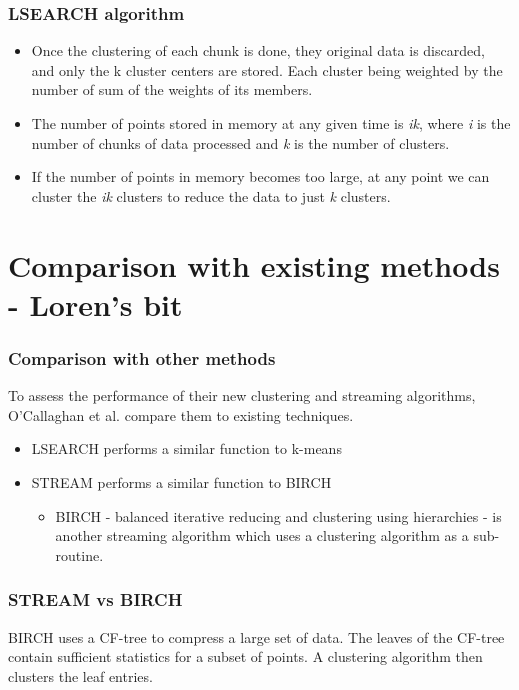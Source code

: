 \documentclass{beamer}
\begin{document}
\frame
{
  \frametitle{LSEARCH algorithm}

   \begin{itemize}
  \item Once the clustering of each chunk is done, they original data
    is discarded, and only the k cluster centers are stored. Each
    cluster being weighted by the number of sum of the weights of its
    members.

  \item The number of points stored in memory at any given time is
    {\em ik}, where {\em i} is the number of chunks of data processed
    and {\em k} is the number of clusters.

  \item If the number of points in memory becomes too large, at any
    point we can cluster the {\em ik} clusters to reduce the data to
    just {\em k} clusters.
  \end{itemize}

}

\section{Comparison with existing methods - Loren's bit}
\frame
{
  \frametitle{Comparison with other methods}
  To assess the performance of their new clustering and streaming algorithms, O'Callaghan et al. compare them to existing techniques.
  
  \bigskip 
  \begin{itemize}
  \item{LSEARCH performs a similar function to k-means}
  \item{STREAM performs a similar function to BIRCH
    \begin{itemize}
      \item{BIRCH - balanced iterative reducing and clustering using hierarchies - is another streaming algorithm which uses a clustering algorithm as a sub-routine.}
    \end{itemize}
  }
  	     
  \end{itemize}
}

\frame
{
  \frametitle{STREAM vs BIRCH}
  BIRCH uses a CF-tree to compress a large set of data. The leaves of the CF-tree contain sufficient statistics for a subset of points. A clustering algorithm then clusters the leaf entries. 
}


  
\end{document}
